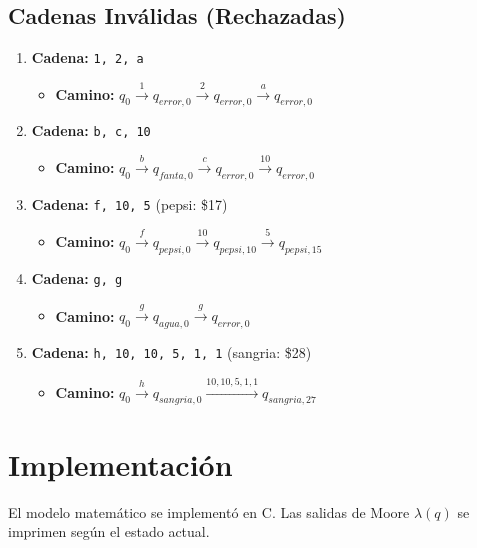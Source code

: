 \documentclass{article}
\begin{document}
\subsection{Cadenas Inválidas (Rechazadas)}
\begin{enumerate}
    \item \textbf{Cadena:} \texttt{1, 2, a}
    \begin{itemize}
        \item \textbf{Camino:} $q_0 \xrightarrow{1} q_{error, 0} \xrightarrow{2} q_{error, 0} \xrightarrow{a} q_{error, 0}$
    \end{itemize}
    \item \textbf{Cadena:} \texttt{b, c, 10}
    \begin{itemize}
        \item \textbf{Camino:} $q_0 \xrightarrow{b} q_{fanta, 0} \xrightarrow{c} q_{error, 0} \xrightarrow{10} q_{error, 0}$
    \end{itemize}
    \item \textbf{Cadena:} \texttt{f, 10, 5} (pepsi: \$17)
    \begin{itemize}
        \item \textbf{Camino:} $q_0 \xrightarrow{f} q_{pepsi, 0} \xrightarrow{10} q_{pepsi, 10} \xrightarrow{5} q_{pepsi, 15}$
    \end{itemize}
    \item \textbf{Cadena:} \texttt{g, g}
    \begin{itemize}
        \item \textbf{Camino:} $q_0 \xrightarrow{g} q_{agua, 0} \xrightarrow{g} q_{error, 0}$
    \end{itemize}
    \item \textbf{Cadena:} \texttt{h, 10, 10, 5, 1, 1} (sangria: \$28)
    \begin{itemize}
        \item \textbf{Camino:} $q_0 \xrightarrow{h} q_{sangria, 0} \xrightarrow{10, 10, 5, 1, 1} q_{sangria, 27}$
    \end{itemize}
\end{enumerate}

\section{Implementación}
El modelo matemático se implementó en C. Las salidas de Moore $\lambda(q)$ se imprimen según el estado actual.

\end{document}
